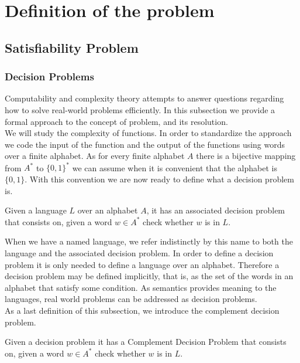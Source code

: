 \chapter{Definition of the problem}
\section{Satisfiability Problem}
\subsection{Decision Problems}
Computability and complexity theory attempts to answer questions regarding how to solve real-world problems efficiently. In this subsection we provide a formal approach to the concept of problem, and its resolution.\\

We will study the complexity of functions. In order to standardize the approach we code the input of the function and the output of the functions using words over a finite alphabet. As for every finite alphabet $A$ there is a bijective mapping from $A^*$ to $\{0,1\}^*$ we can assume when it is convenient that the alphabet is $\{0,1\}$. With this convention we are now ready to define what a decision problem is.

\begin{definition}
  Given a language $L$ over an alphabet $A$, it has an associated decision problem that consists on, given a word $w\in A^*$ check whether $w$ is in $L$. 	
\end{definition}


When we have a named language, we refer indistinctly by this name to both the language and the associated decision problem. In order to define a decision problem it is only needed to define a language over an alphabet. Therefore a decision problem may be defined implicitly, that is, as the set of the words in an alphabet that satisfy some condition. As semantics provides meaning to the languages, real world problems can be addressed as decision problems.\\

As a last definition of this subsection, we introduce the complement decision problem.
\begin{definition}
  Given a decision problem it has a Complement Decision Problem that consists on, given a word $w\in A^*$ check whether $w$ is in $L$. 	
\end{definition}

